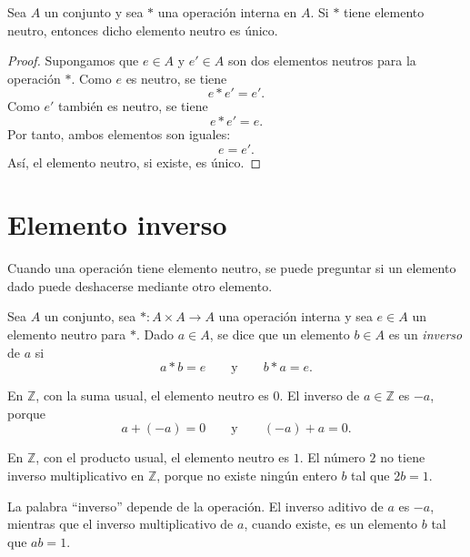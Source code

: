 \begin{proposicion}
Sea \(A\) un conjunto y sea \(*\) una operación interna en \(A\). Si \(*\) tiene elemento neutro, entonces dicho elemento neutro es único.
\end{proposicion}

\begin{proof}
Supongamos que \(e\in A\) y \(e'\in A\) son dos elementos neutros para la operación \(*\). Como \(e\) es neutro, se tiene
\[
  e*e'=e'.
\]
Como \(e'\) también es neutro, se tiene
\[
  e*e'=e.
\]
Por tanto, ambos elementos son iguales:
\[
  e=e'.
\]
Así, el elemento neutro, si existe, es único.
\end{proof}

\section{Elemento inverso}

Cuando una operación tiene elemento neutro, se puede preguntar si un elemento dado puede deshacerse mediante otro elemento.

\begin{definicion}
Sea \(A\) un conjunto, sea \(*:A\times A\to A\) una operación interna y sea \(e\in A\) un elemento neutro para \(*\). Dado \(a\in A\), se dice que un elemento \(b\in A\) es un \emph{inverso} de \(a\) si
\[
  a*b=e
  \qquad\text{y}\qquad
  b*a=e.
\]
\end{definicion}

\begin{ejemplo}
En \(\mathbb{Z}\), con la suma usual, el elemento neutro es \(0\). El inverso de \(a\in\mathbb{Z}\) es \(-a\), porque
\[
  a+(-a)=0
  \qquad\text{y}\qquad
  (-a)+a=0.
\]
\end{ejemplo}

\begin{ejemplo}
En \(\mathbb{Z}\), con el producto usual, el elemento neutro es \(1\). El número \(2\) no tiene inverso multiplicativo en \(\mathbb{Z}\), porque no existe ningún entero \(b\) tal que \(2b=1\).
\end{ejemplo}

\begin{advertencia}
La palabra ``inverso'' depende de la operación. El inverso aditivo de \(a\) es \(-a\), mientras que el inverso multiplicativo de \(a\), cuando existe, es un elemento \(b\) tal que \(ab=1\).
\end{advertencia}

